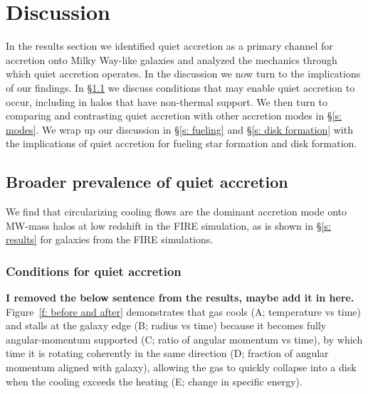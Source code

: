 \documentclass[fleqn,usenatbib]{mnras}
\begin{document}
\section{Discussion}
\label{s: discussion}

In the results section we identified quiet accretion as a primary channel for accretion onto Milky Way-like galaxies and analyzed the mechanics through which quiet accretion operates.
In the discussion we now turn to the implications of our findings.
In \S\ref{s: broader prevalence} we discuss conditions that may enable quiet accretion to occur, including in halos that have non-thermal support.
We then turn to comparing and contrasting quiet accretion with other accretion modes in \S\ref{s: modes}.
We wrap up our discussion in \S\ref{s: fueling} and \S\ref{s: disk formation} with the implications of quiet accretion for fueling star formation and disk formation.

\subsection{Broader prevalence of quiet accretion}
\label{s: broader prevalence}

We find that circularizing cooling flows are the dominant accretion mode onto MW-mass halos at low redshift in the FIRE simulation, as is shown in \S\ref{s: results} for galaxies from the FIRE simulations.

\subsubsection{Conditions for quiet accretion}
\label{s: broader prevalence -- conditions}

\textbf{I removed the below sentence from the results, maybe add it in here.}
Figure~\ref{f: before and after} demonstrates that gas cools (A; temperature vs time) and stalls at the galaxy edge (B; radius vs time) because it becomes fully angular-momentum supported (C; ratio of angular momentum vs time), by which time it is rotating coherently in the same direction (D; fraction of angular momentum aligned with galaxy), allowing the gas to quickly collapse into a disk when the cooling exceeds the heating (E; change in specific energy).
\end{document}
